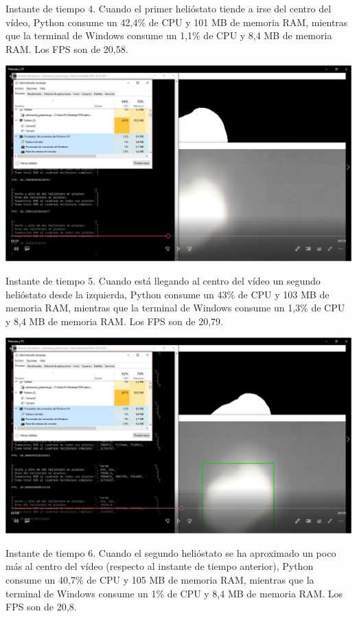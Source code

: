 \documentclass[12pt]{article}
\begin{document}
Instante de tiempo 4. Cuando el primer helióstato tiende a irse del centro del vídeo, Python consume un 42,4\% de CPU y 101 MB de memoria RAM, mientras que la terminal de Windows consume un 1,1\% de CPU y 8,4 MB de memoria RAM. Los FPS son de 20,58.


\includegraphics[width=\textwidth]{CapturasRendimientoSoftware2/Imagen5.png}

Instante de tiempo 5. Cuando está llegando al centro del vídeo un segundo helióstato desde la izquierda, Python consume un 43\% de CPU y 103 MB de memoria RAM, mientras que la terminal de Windows consume un 1,3\% de CPU y 8,4 MB de memoria RAM. Los FPS son de 20,79.


\includegraphics[width=\textwidth]{CapturasRendimientoSoftware2/Imagen6.png}

Instante de tiempo 6. Cuando el segundo helióstato se ha aproximado un poco más al centro del vídeo (respecto al instante de tiempo anterior), Python consume un 40,7\% de CPU y 105 MB de memoria RAM, mientras que la terminal de Windows consume un 1\% de CPU y 8,4 MB de memoria RAM. Los FPS son de 20,8.
\end{document}
